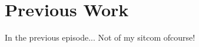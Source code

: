 \documentclass[../main.tex]{subfiles}
\begin{document}
\section{Previous Work}
In the previous episode... Not of my sitcom ofcourse!
\end{document}
